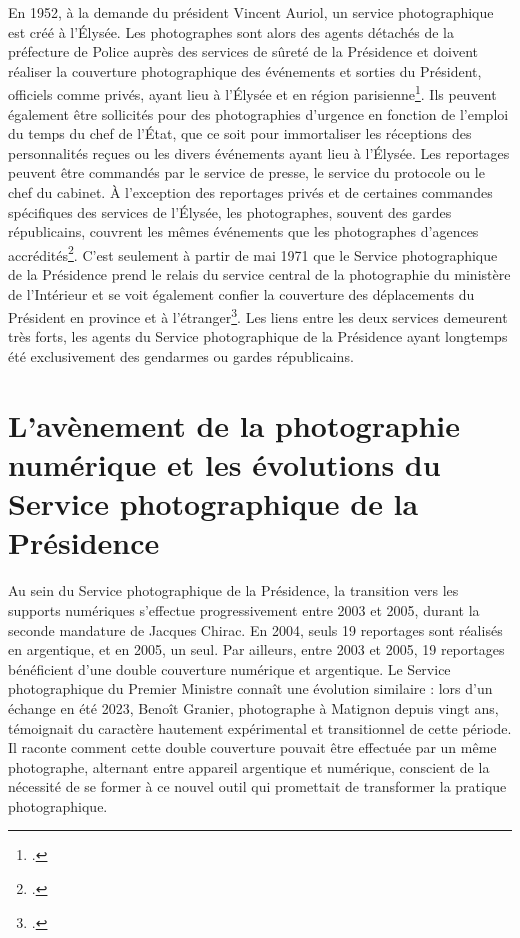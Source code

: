 En 1952, à la demande du président Vincent Auriol, un service photographique est créé à l'Élysée. Les photographes sont alors des agents détachés de la préfecture de Police auprès des services de sûreté de la Présidence et doivent réaliser la couverture photographique des événements et sorties du Président, officiels comme privés, ayant lieu à l'Élysée et en région parisienne\footcite{batReportagesPhotographiquesAutour2016}. Ils peuvent également être sollicités pour des photographies d'urgence en fonction de l'emploi du temps du chef de l'État, que ce soit pour immortaliser les réceptions des personnalités reçues ou les divers événements ayant lieu à l'Élysée. Les reportages peuvent être commandés par le service de presse, le service du protocole ou le chef du cabinet. À l'exception des reportages privés et de certaines commandes spécifiques des services de l'Élysée, les photographes, souvent des gardes républicains, couvrent les mêmes événements que les photographes d'agences accrédités\footcite{perez-bastiePresidenceJacquesChirac2015}. C'est seulement à partir de mai 1971 que le Service photographique de la Présidence prend le relais du service central de la photographie du ministère de l'Intérieur et se voit également confier la couverture des déplacements du Président en province et à l'étranger\footcite{bouillonRepresentationsCharlesGaulle2016}. Les liens entre les deux services demeurent très forts, les agents du Service photographique de la Présidence ayant longtemps été exclusivement des gendarmes ou gardes républicains.


\section{L'avènement de la photographie numérique et les évolutions du Service photographique de la Présidence}

Au sein du Service photographique de la Présidence, la transition vers les supports numériques s'effectue progressivement entre 2003 et 2005, durant la seconde mandature de Jacques Chirac. En 2004, seuls 19 reportages sont réalisés en argentique, et en 2005, un seul. Par ailleurs, entre 2003 et 2005, 19 reportages bénéficient d'une double couverture numérique et argentique. Le Service photographique du Premier Ministre connaît une évolution similaire : lors d'un échange en été 2023, Benoît Granier, photographe à Matignon depuis vingt ans, témoignait du caractère hautement expérimental et transitionnel de cette période. Il raconte comment cette double couverture pouvait être effectuée par un même photographe, alternant entre appareil argentique et numérique, conscient de la nécessité de se former à ce nouvel outil qui promettait de transformer la pratique photographique.

